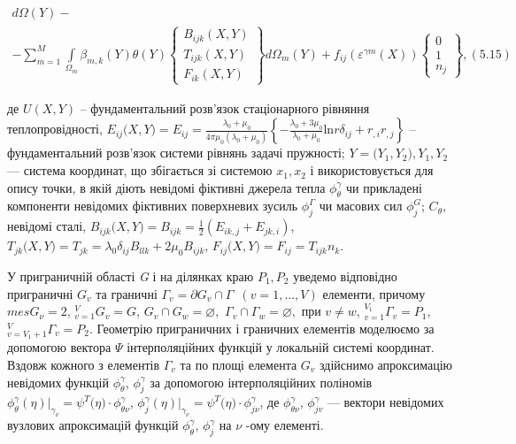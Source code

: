 \begin{equation*}
\begin{split}
            d\Omega(Y) - \\ - 
        \sum \limits_{m=1}^M \int \limits_{\Omega_m} \beta_{m,k}(Y) \theta(Y) 
                \left\{ \begin{array}{lr} B_{ijk}(X,Y) \\ T_{ijk}(X,Y) \\ F_{ik}(X,Y) \end{array} \right \} d\Omega_m(Y) +
        f_{ij}(\varepsilon^{\gamma m}(X)) 
        \left\{ \begin{array}{lr} 0 \\ 1 \\ n_j \end{array} \right \}, (5.15)
    \end{split}
\end{equation*}

\noindent де $U(X,Y)$ -- фундаментальний розв'язок стаціонарного рівняння теплопровідності,
$E_{\mathit{\text{ij}}}(X,Y{) = E_{\mathit{\text{ij}}} = \frac{\lambda_{0} + \mu_{0}}{4 \pi \mu_0({\lambda_{0} + \mu_{0}})}}\left\{ {{- \frac{{\lambda_{0} + 3}\mu_{0}}{\lambda_{0} + \mu_{0}}}\text{ln}{\mathit{r\delta}_{\mathit{\text{ij}}} + r_{,i}}r_{,j}} \right\}$
-- фундаментальний розв'язок системи рівнянь задачі пружності; ${Y = (}Y_{1},Y_{2}), Y_{1},Y_{2}$--- система координат,
що збігається зі системою $x_{1},x_{2}$ і використовується для опису точки, в якій діють невідомі фіктивні джерела тепла
$\phi_{\theta}^{\gamma}$ чи прикладені компоненти невідомих фіктивних поверхневих зусиль $\phi_{j}^{\Gamma}$ чи масових
сил $\phi_{j}^{G}$; $C_{\theta}$, невідомі сталі,
$B_{\mathit{\text{ijk}}}(X,Y{) = B_{\mathit{\text{ijk}}} = \frac{1}{2}}({E_{\mathit{\text{ik}},j} + E_{\mathit{\text{jk}},i}})$,
$T_{\mathit{\text{jk}}}(X,Y{) = T_{\mathit{\text{jk}}} = \lambda_{0}}\delta_{\mathit{\text{ij}}}{B_{\mathit{\text{llk}}} + 2}\mu_{0}B_{\mathit{\text{ijk}}}$,
$F_{\mathit{\text{ij}}}(X,Y{) = F_{\mathit{\text{ij}}} = T_{\mathit{\text{ijk}}}}n_{k}$.

У приграничній області \emph{G} і на ділянках краю $P_{1},P_{2}$ уведемо відповідно приграничні $G_v$ та граничні
${\Gamma_{v} = \partial}{G_{v} \cap \Gamma}\mspace{9mu}$$({v = 1},\text{.}\text{.}\text{.},V)$ елементи, при­чому
$\mathit{\text{mes}} {G_{\nu} = 2}$, ${}_{v = 1}^{V}{G_{v} = G}$, ${{G_{v} \cap G_{w}} = \varnothing},$ ${{\Gamma_{v}
\cap \Gamma_{w}} = \varnothing},$ при $v \neq w$, ${}_{v = 1}^{V_{1}}\Gamma_{v}{= P_{1}}$, ${}_{v = {V_{1} +
1}}^{V}\Gamma_{v}{= P_{2}}$. Геометрію приграничних і граничних елементів моделюємо за допомогою вектора $\Psi$ 
інтерполяційних функцій у локальній системі координат. Вздовж кожного з елементів $\Gamma_v$ та по площі елемента
$G_v$ здійснимо апроксимацію невідомих функцій $\phi_{\theta}^\gamma$, $\phi_{j}^\gamma$ за допомогою інтерполяційних 
поліномів $\phi_{\theta}^{\gamma}(\eta){|_{\gamma_{\nu}} = \psi^{T}}{(\eta{) \cdot \phi_{\theta \nu}^{\gamma}}}$,
$\phi_{j}^{\gamma}(\eta){|_{\gamma_{\nu}} = \psi^{T}}{(\eta{) \cdot \phi_{\mathit{j\nu}}^{\gamma}}}$,
де $\phi_{\theta \nu}^{\gamma}$, $\phi_{jv}^{\gamma}$ --- вектори невідомих вузлових апроксимацій функцій 
$\phi_{\theta}^{\gamma}$, $\phi_{j}^{\gamma}$ на $\nu$ -ому елементі.

